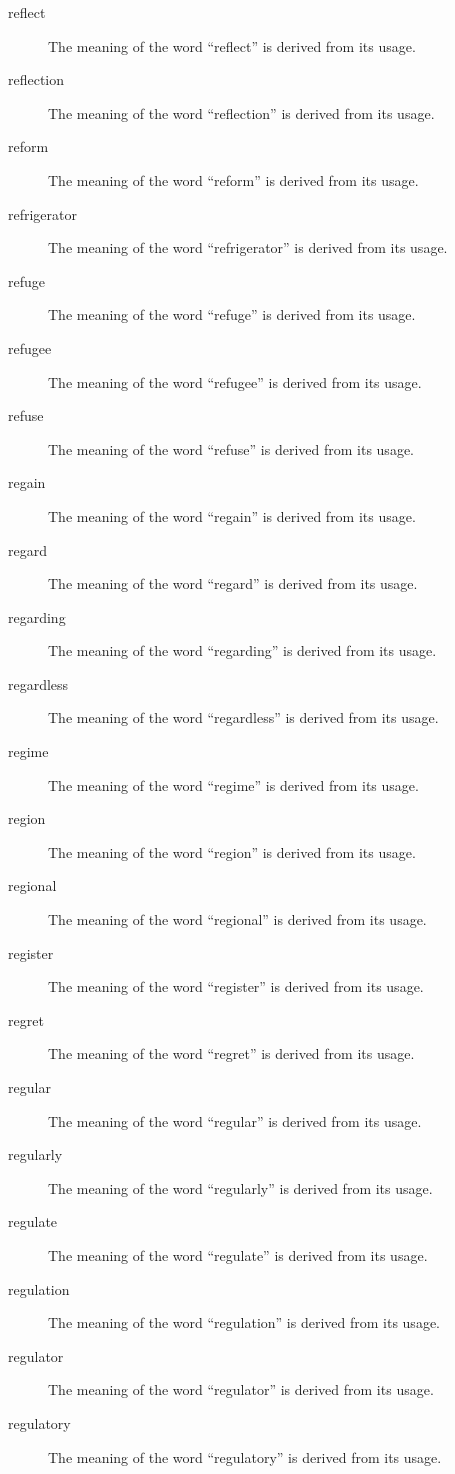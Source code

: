 \documentclass[12pt, letterpaper]{memoir}
\begin{document}
\begin{description}
\item[reflect] The meaning of the word ``reflect'' is derived from its usage.
\item[reflection] The meaning of the word ``reflection'' is derived from its usage.
\item[reform] The meaning of the word ``reform'' is derived from its usage.
\item[refrigerator] The meaning of the word ``refrigerator'' is derived from its usage.
\item[refuge] The meaning of the word ``refuge'' is derived from its usage.
\item[refugee] The meaning of the word ``refugee'' is derived from its usage.
\item[refuse] The meaning of the word ``refuse'' is derived from its usage.
\item[regain] The meaning of the word ``regain'' is derived from its usage.
\item[regard] The meaning of the word ``regard'' is derived from its usage.
\item[regarding] The meaning of the word ``regarding'' is derived from its usage.
\item[regardless] The meaning of the word ``regardless'' is derived from its usage.
\item[regime] The meaning of the word ``regime'' is derived from its usage.
\item[region] The meaning of the word ``region'' is derived from its usage.
\item[regional] The meaning of the word ``regional'' is derived from its usage.
\item[register] The meaning of the word ``register'' is derived from its usage.
\item[regret] The meaning of the word ``regret'' is derived from its usage.
\item[regular] The meaning of the word ``regular'' is derived from its usage.
\item[regularly] The meaning of the word ``regularly'' is derived from its usage.
\item[regulate] The meaning of the word ``regulate'' is derived from its usage.
\item[regulation] The meaning of the word ``regulation'' is derived from its usage.
\item[regulator] The meaning of the word ``regulator'' is derived from its usage.
\item[regulatory] The meaning of the word ``regulatory'' is derived from its usage.

\end{description}
\end{document}
